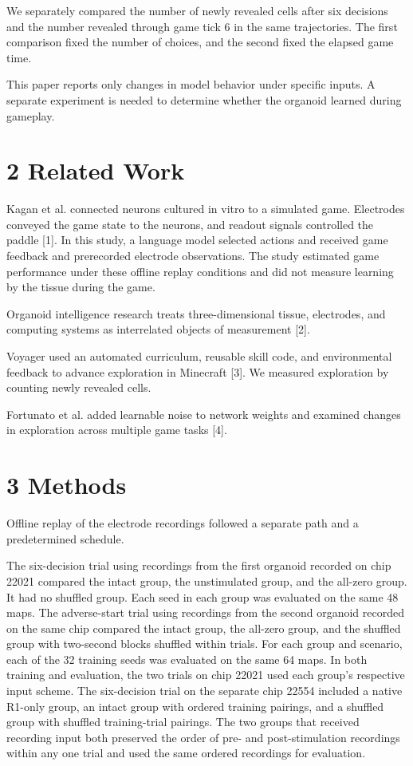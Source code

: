 \documentclass{article}
\begin{document}
We separately compared the number of newly revealed cells after six decisions and the number revealed through game tick 6 in the same trajectories. The first comparison fixed the number of choices, and the second fixed the elapsed game time.


This paper reports only changes in model behavior under specific inputs. A separate experiment is needed to determine whether the organoid learned during gameplay.


\section*{2 Related Work}

Kagan et al. connected neurons cultured in vitro to a simulated game. Electrodes conveyed the game state to the neurons, and readout signals controlled the paddle [1]. In this study, a language model selected actions and received game feedback and prerecorded electrode observations. The study estimated game performance under these offline replay conditions and did not measure learning by the tissue during the game.


Organoid intelligence research treats three-dimensional tissue, electrodes, and computing systems as interrelated objects of measurement [2].


Voyager used an automated curriculum, reusable skill code, and environmental feedback to advance exploration in Minecraft [3]. We measured exploration by counting newly revealed cells.


Fortunato et al. added learnable noise to network weights and examined changes in exploration across multiple game tasks [4].


\section*{3 Methods}

Offline replay of the electrode recordings followed a separate path and a predetermined schedule.


The six-decision trial using recordings from the first organoid recorded on chip 22021 compared the intact group, the unstimulated group, and the all-zero group. It had no shuffled group. Each seed in each group was evaluated on the same 48 maps. The adverse-start trial using recordings from the second organoid recorded on the same chip compared the intact group, the all-zero group, and the shuffled group with two-second blocks shuffled within trials. For each group and scenario, each of the 32 training seeds was evaluated on the same 64 maps. In both training and evaluation, the two trials on chip 22021 used each group's respective input scheme. The six-decision trial on the separate chip 22554 included a native R1-only group, an intact group with ordered training pairings, and a shuffled group with shuffled training-trial pairings. The two groups that received recording input both preserved the order of pre- and post-stimulation recordings within any one trial and used the same ordered recordings for evaluation.
\end{document}
